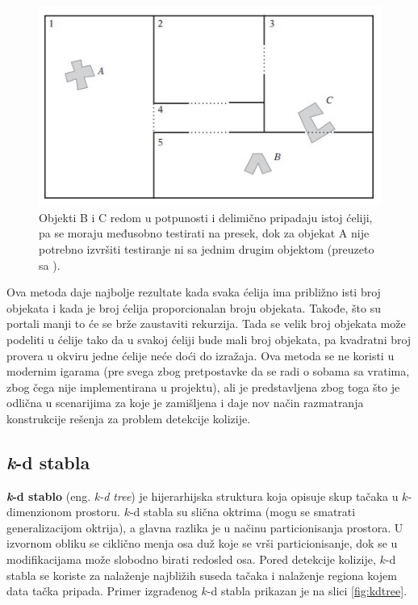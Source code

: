 \documentclass[12pt,oneside]{memoir}
\begin{document}
\begin{figure}[h!]
	\centering
	\includegraphics[scale=1]{cellsObj.jpg}
	\caption{ Objekti B i C redom u potpunosti i delimično pripadaju istoj ćeliji, pa se moraju međusobno testirati na presek,
	 dok za objekat A nije potrebno izvršiti testiranje ni sa jednim drugim objektom (preuzeto sa \cite{glavnaKnjiga}). }
	
	\label{fig:cellsObj}
\end{figure}

Ova metoda daje najbolje rezultate kada svaka ćelija ima približno isti broj objekata i kada je 
broj ćelija proporcionalan broju objekata.
Takođe, što su portali manji to će se brže zaustaviti rekurzija.
Tada se velik broj objekata može podeliti u ćelije tako da u svakoj ćeliji bude mali broj objekata,
pa kvadratni broj provera u okviru jedne ćelije neće doći do izražaja.
Ova metoda se ne koristi u modernim igarama (pre svega zbog pretpostavke da se radi o sobama sa vratima, zbog čega nije implementirana u projektu),
ali je predstavljena zbog toga što je odlična u scenarijima za
koje je zamišljena i daje nov način razmatranja konstrukcije rešenja za problem detekcije kolizije.


\subsection{\emph{k}-d stabla}
\label{subsec:grid}

\textbf{\emph{k}-d stablo} (eng. {\em k-d tree}) je hijerarhijska struktura koja opisuje skup tačaka u $k$-dimenzionom prostoru.
$k$-d stabla su slična oktrima (mogu se smatrati generalizacijom oktrija), a glavna razlika je u načinu particionisanja prostora.
U izvornom obliku se ciklično menja osa duž koje se vrši particionisanje, dok se u modifikacijama može slobodno birati redosled osa.
Pored detekcije kolizije, $k$-d stabla se koriste za nalaženje najbližih suseda tačaka i nalaženje regiona kojem data tačka pripada.
Primer izgrađenog $k$-d stabla prikazan je na slici \ref{fig:kdtree}.
\end{document}
